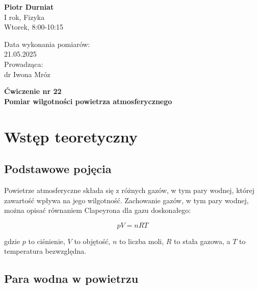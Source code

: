\documentclass[a4paper,12pt]{article}
\begin{document}
\noindent
\begin{minipage}{0.5\textwidth}
    \raggedright
    \textbf{Piotr Durniat} \\
    I rok, Fizyka \\
    Wtorek, 8:00-10:15 \\
    \vspace{0.5cm}
    \vspace{0.5cm}
\end{minipage}%
\begin{minipage}{0.5\textwidth}
    \raggedleft
    Data wykonania pomiarów: \\
    21.05.2025 \\
    \vspace{0.5cm}
    Prowadząca: \\
    dr Iwona Mróz
\end{minipage}

\vspace{2cm}
\begin{center}
    \LARGE \textbf{Ćwiczenie nr 22} \\[0.5cm]
    \Large \textbf{Pomiar wilgotności powietrza atmosferycznego}
\end{center}

\vspace{1cm} %
\noindent

\tableofcontents
\newpage

\section{Wstęp teoretyczny}

\subsection{Podstawowe pojęcia}

Powietrze atmosferyczne składa się z różnych gazów, w tym pary wodnej, której zawartość wpływa na jego wilgotność. Zachowanie gazów, w tym pary wodnej, można opisać równaniem Clapeyrona dla gazu doskonałego:

\begin{equation}
    pV = nRT
\end{equation}

gdzie $p$ to ciśnienie, $V$ to objętość, $n$ to liczba moli, $R$ to stała gazowa, a $T$ to temperatura bezwzględna.

\subsection{Para wodna w powietrzu}
\end{document}
